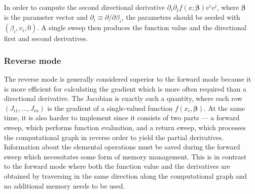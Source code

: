 \documentclass{article}
\begin{document}
In order to compute the second directional derivative $\partial_i\partial_j f(x; \bm\beta) v^iv^j$, where $\bm\beta$ is the parameter vector and $\partial_i \equiv \partial/\partial\beta_i$, the parameters should be seeded with $(\beta_i, v_i, 0)$. A single sweep then produces the function value and the directional first and second derivatives.

\subsubsection{Reverse mode}

The reverse mode is generally considered superior to the forward mode because it is more efficient for calculating the gradient which is more often required than a directional derivative. The Jacobian is exactly such a quantity, where each row $(J_{i1}, \ldots, J_{in})$ is the gradient of a single-valued function $f(x_i, \bm\beta)$. At the same time, it is also harder to implement since it consists of two parts --- a forward sweep, which performs function evaluation, and a return sweep, which processes the computational graph in reverse order to yield the partial derivatives. Information about the elemental operations must be saved during the forward sweep which necessitates some form of memory management. This is in contrast to the forward mode where both the function value and the derivatives are obtained by traversing in the same direction along the computational graph and no additional memory needs to be used.
\end{document}
